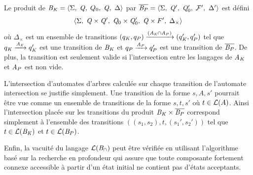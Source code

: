 \begin{definition}
  Le produit de $\mathit B_\mathit K = \langle \Sigma,\; \mathit Q,\; Q_0,\; \mathit Q,\ \Delta\rangle$ par 
  $\overline{\B_P} = \la\Sigma,\; \Q',\;\Q'_0,\; \F',\ \Delta'\ra$ est défini
  \[\langle \Sigma,\; \mathit Q \times \mathit Q',\; \mathit Q_0 \times \mathit Q'_0,\; \mathit Q \times F',\; \Delta_\times\rangle \]
  où $\Delta_\times$ est un ensemble de transitions $(q_\mathit K, q_P) \xrightarrow{(\mathit A_\mathit K\cap\mathit A_P)} (q'_\mathit K, q'_P)$ tel que $q_\mathit K
  \xrightarrow{\mathit A_\mathit K} q'_\mathit K$ est une transition
  de $\mathit B_\mathit K$ et $q_P \xrightarrow{\mathit A_P} q'_P$ est une transition de $\overline{\mathit B_P}$. De plus, la transition 
  est seulement valide si l'intersection entre les langages de $\mathit A_\mathit K$ et $\mathit A_P$ est non vide.
\end{definition}
L'intersection d'automates d'arbres calculée sur chaque transition de
l'automate intersection se justifie simplement.  Une transition de la forme
$s, A, s'$ pourrait être vue comme un ensemble de transitions de la
forme $s, t, s'$ où $t \in \mathcal{L}(A)$. Ainsi l'intersection placée sur
les transitions du produit $\mathit B_\mathit K \times \overline{\mathit B_P}$ correspond
simplement à l'ensemble des transitions $((s_1, s_2), t, (s_1',s_2'))$
tel que $t \in \mathcal{L}(\mathit B_\mathit K)$ et $t \in \mathcal{L}(\mathit B_P)$.

Enfin, la vacuité du langage $\mathcal{L}{}(\mathit B_\cap)$ peut être vérifiée en utilisant l'algorithme
basé sur la recherche en profondeur qui assure que toute composante fortement connexe accessible à partir d'un état initial
ne contient pas d'états acceptants.


